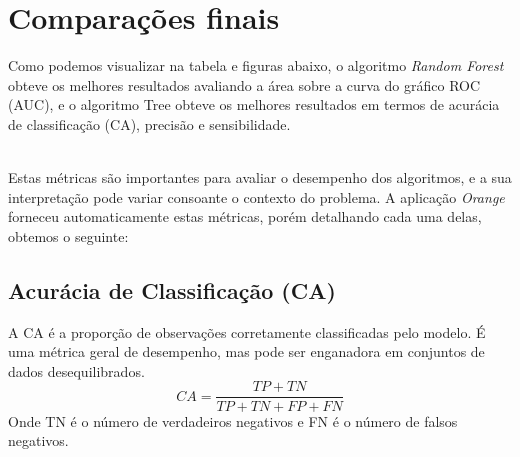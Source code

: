 \documentclass[conference]{IEEEtran}
\begin{document}
\section{Comparações finais}
Como podemos visualizar na tabela e figuras abaixo, o algoritmo \textit{Random Forest} obteve os melhores resultados avaliando a área sobre
a curva do gráfico ROC (AUC), e o algoritmo Tree obteve os melhores resultados em termos de acurácia de classificação (CA), precisão e sensibilidade.
\begin{table}[!ht]
	\centering
	\label{tab:evaluation_results}
	\caption{Comparação de Resultados dos Algoritmos}
\end{table}
\\

Estas métricas são importantes para avaliar o desempenho dos algoritmos, e a sua interpretação pode variar consoante o contexto do problema.
A aplicação \textit{Orange} forneceu automaticamente estas métricas, porém detalhando cada uma delas, obtemos o seguinte:
\subsection{Acurácia de Classificação (CA)}
A CA é a proporção de observações corretamente classificadas pelo modelo. É uma métrica geral de desempenho, mas pode ser enganadora em conjuntos de dados
desequilibrados.
\begin{equation}
	CA = \frac{TP + TN}{TP + TN + FP + FN}
\end{equation}
Onde TN é o número de verdadeiros negativos e FN é o número de falsos negativos.
\end{document}
